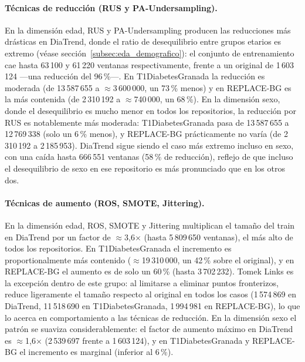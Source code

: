 \paragraph{Técnicas de reducción (RUS y PA-Undersampling).}
En la dimensión edad, RUS y PA-Undersampling producen las reducciones más drásticas
en DiaTrend, donde el ratio de desequilibrio entre grupos etarios es extremo
(véase sección~\ref{subsec:eda_demografico}): el conjunto de entrenamiento cae
hasta 63\,100 y 61\,220 ventanas respectivamente, frente a un original de
1\,603\,124 ---una reducción del 96\,\%---. En T1DiabetesGranada la reducción
es moderada (de 13\,587\,655 a $\approx$3\,600\,000, un 73\,\% menos) y en
REPLACE-BG es la más contenida (de 2\,310\,192 a $\approx$740\,000, un 68\,\%).
En la dimensión sexo, donde el desequilibrio es mucho menor en todos los
repositorios, la reducción por RUS es notablemente más moderada: T1DiabetesGranada
pasa de 13\,587\,655 a 12\,769\,338 (solo un 6\,\% menos), y REPLACE-BG
prácticamente no varía (de 2\,310\,192 a 2\,185\,953). DiaTrend sigue siendo el
caso más extremo incluso en sexo, con una caída hasta 666\,551 ventanas (58\,\%
de reducción), reflejo de que incluso el desequilibrio de sexo en ese repositorio
es más pronunciado que en los otros dos.

\paragraph{Técnicas de aumento (ROS, SMOTE, Jittering).}
En la dimensión edad, ROS, SMOTE y Jittering multiplican el tamaño del train en
DiaTrend por un factor de $\approx$3{,}6$\times$ (hasta 5\,809\,650 ventanas),
el más alto de todos los repositorios. En T1DiabetesGranada el incremento es
proportionalmente más contenido ($\approx$19\,310\,000, un 42\,\% sobre el
original), y en REPLACE-BG el aumento es de solo un 60\,\% (hasta 3\,702\,232).
Tomek Links es la excepción dentro de este grupo: al limitarse a eliminar puntos
fronterizos, reduce ligeramente el tamaño respecto al original en todos los casos
(1\,574\,869 en DiaTrend, 11\,518\,690 en T1DiabetesGranada, 1\,994\,981 en
REPLACE-BG), lo que lo acerca en comportamiento a las técnicas de reducción.
En la dimensión sexo el patrón se suaviza considerablemente: el factor de aumento
máximo en DiaTrend es $\approx$1{,}6$\times$ (2\,539\,697 frente a 1\,603\,124),
y en T1DiabetesGranada y REPLACE-BG el incremento es marginal (inferior al 6\,\%).

